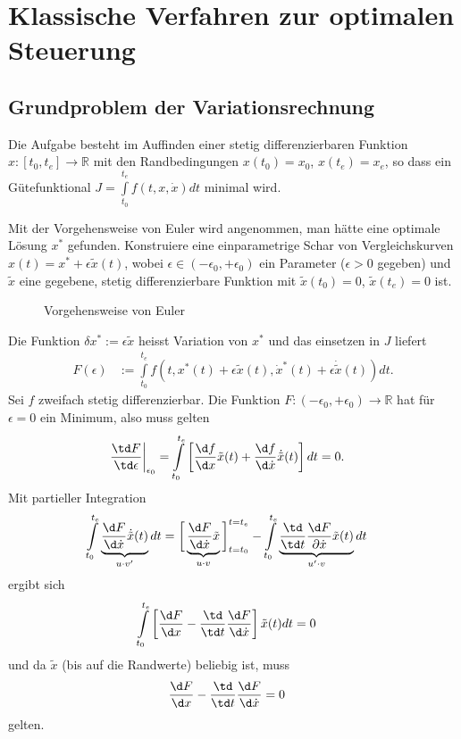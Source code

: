 \chapter{Klassische Verfahren zur optimalen Steuerung}
\section{Grundproblem der Variationsrechnung}
Die Aufgabe besteht im Auffinden einer stetig differenzierbaren Funktion $x:[t_0,t_e]\rightarrow\mathbb{R}$ mit den Randbedingungen $x(t_0)=x_0$, $x(t_e)=x_e$, so dass ein
Gütefunktional $J=\int\limits_{t_0}^{t_e}f(t,x,\dot{x}) dt$ minimal wird.

Mit der Vorgehensweise von Euler wird angenommen, man hätte eine optimale Lösung $x^{\ast}$ gefunden. Konstruiere eine einparametrige Schar von Vergleichskurven
$x(t)=x^{\ast}+\epsilon\tilde{x}(t)$, wobei $\epsilon\in(-\epsilon_0,+\epsilon_0)$ ein Parameter ($\epsilon>0$ gegeben) und $\tilde{x}$ eine gegebene, stetig differenzierbare Funktion
mit $\tilde{x}(t_0)=0$, $\tilde{x}(t_e)=0$ ist.
\begin{figure}[htb]
	\centering
	
	\caption{Vorgehensweise von Euler}
	\label{fig:kap_2_vorg_euler}
\end{figure}
Die Funktion $\delta x^{\ast}:= \epsilon\tilde{x}$ heisst Variation von $x^{\ast}$ und das einsetzen in $J$ liefert 
\begin{align*}
	F(\epsilon) & := \int\limits_{t_0}^{t_e}f(t,x^{\ast}(t)+\epsilon\tilde{x}(t),\dot{x}^{\ast}(t)+\epsilon\dot{\tilde{x}}(t))dt.
\end{align*}
Sei $f$ zweifach stetig differenzierbar. Die Funktion $F:(-\epsilon_0,+\epsilon_0)\rightarrow\mathbb{R}$ hat für $\epsilon=0$ ein Minimum, also muss gelten
\begin{align*}
	\left.\frac{\td F}{\td \epsilon}\right|_{\epsilon_0} & = \int\limits_{t_0}^{t_e}\left[\frac{\d f}{\d x}\tilde{x}(t)+\frac{\d f}{\d\dot{x}}\dot{\tilde{x}}(t)
	\right]dt = 0.
\end{align*}
Mit partieller Integration 
\begin{align*}
	\int\limits_{t_0}^{t_e}\underbrace{\frac{\d F}{\d \dot{x}}\dot{\tilde{x}}(t)}_{u\cdot v'}dt & = \bigg[\underbrace{\frac{\d
	F}{\d\dot{x}}\tilde{x}}_{u\cdot v}\bigg]_{t=t_0}^{t=t_e}-\int\limits_{t_0}^{t_e} \underbrace{\frac{\td}{\td t}\frac{\d F}{\partial\dot{x}}\tilde{x}(t)}_{u'\cdot v}dt
\end{align*}
ergibt sich
\begin{align*}
	\int\limits_{t_0}^{t_e}\left[\frac{\d F}{\d x}-\frac{\td}{\td t}\frac{\d F}{\d\dot{x}} \right]\tilde{x}(t)dt & = 0
\end{align*}
und da $\tilde{x}$ (bis auf die Randwerte) beliebig ist, muss 
\begin{align}
	\frac{\d F}{\d x}-\frac{\td}{\td t}\frac{\d F}{\d\dot{x}} & = 0
\end{align}
gelten.

